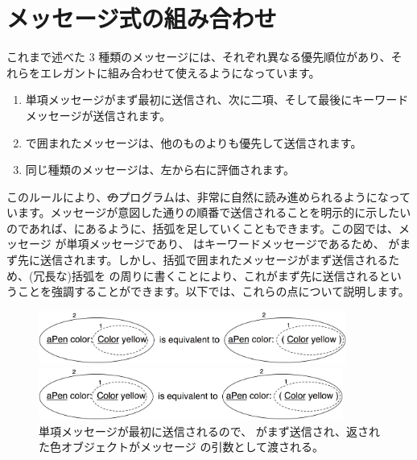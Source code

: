 \documentclass[a4paper,10pt,twoside]{book}
\begin{document}

\section{メッセージ式の組み合わせ}
これまで述べた 3 種類のメッセージには、それぞれ異なる優先順位があり、それらをエレガントに組み合わせて使えるようになっています。

\begin{enumerate}
\item 単項メッセージがまず最初に送信され、次に二項、そして最後にキーワードメッセージが送信されます。
\item {}で囲まれたメッセージは、他のものよりも優先して送信されます。
\item 同じ種類のメッセージは、左から右に評価されます。
\end{enumerate}

このルールにより、\st のプログラムは、非常に自然に読み進められるようになっています。メッセージが意図した通りの順番で送信されることを明示的に示したいのであれば、にあるように、括弧を足していくこともできます。この図では、メッセージ  が単項メッセージであり、 はキーワードメッセージであるため、 がまず先に送信されます。しかし、括弧で囲まれたメッセージがまず送信されるため、(冗長な)括弧を  の周りに書くことにより、これがまず先に送信されるということを強調することができます。以下では、これらの点について説明します。

\begin{figure}[ht]
\ifluluelse
	{\centerline{\includegraphics[width=0.9\textwidth]{uKeyUn}} }
	{\centerline{\includegraphics[width=10cm]{uKeyUn}} }
\caption{単項メッセージが最初に送信されるので、 がまず送信され、返された色オブジェクトがメッセージ  の引数として渡される。}
\end{figure}
\end{document}
